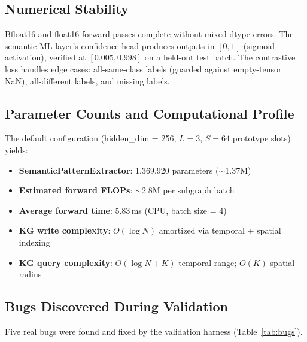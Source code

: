 \documentclass{article}
\begin{document}
\subsection{Numerical Stability}

Bfloat16 and float16 forward passes complete without mixed-dtype errors. The
semantic ML layer's confidence head produces outputs in $[0, 1]$ (sigmoid
activation), verified at $[0.005, 0.998]$ on a held-out test batch. The
contrastive loss handles edge cases: all-same-class labels (guarded against
empty-tensor NaN), all-different labels, and missing labels.

\subsection{Parameter Counts and Computational Profile}

The default configuration (hidden\_dim = 256, $L = 3$, $S = 64$ prototype slots)
yields:

\begin{itemize}
  \item \textbf{SemanticPatternExtractor}: 1,369,920 parameters ($\sim$1.37M)
  \item \textbf{Estimated forward FLOPs}: $\sim$2.8M per subgraph batch
  \item \textbf{Average forward time}: 5.83\,ms (CPU, batch size = 4)
  \item \textbf{KG write complexity}: $O(\log N)$ amortized via temporal + spatial
        indexing
  \item \textbf{KG query complexity}: $O(\log N + K)$ temporal range;
        $O(K)$ spatial radius
\end{itemize}

\subsection{Bugs Discovered During Validation}

Five real bugs were found and fixed by the validation harness (Table~\ref{tab:bugs}).
\end{document}
